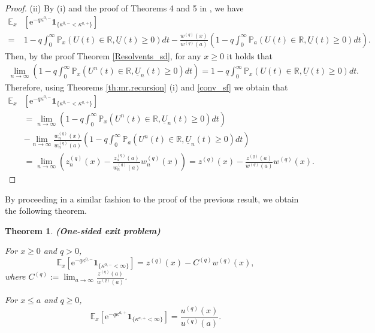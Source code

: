 \documentclass[12pt,reqno]{amsart}
\newtheorem{theorem}{Theorem}
\theoremstyle{definition}
\theoremstyle{remark}
\newcommand{\e}{\mathbb{E}}
\newcommand{\ind}{\mathbf{1}}
\newcommand{\wq}{w^{(q)}}
\begin{document}
\begin{proof}
(ii) By (i) and the proof of Theorems 4 and 5 in \cite{kyprianouloeffen2010}, we have
\begin{align*}
\e_x &\left[ \mathrm{e}^{-q \kappa^{0,-}} \ind_{\{\kappa^{0,-}<\kappa^{a,+}\}} \right]\\
=&1-q\int_0^{\infty}\mathbb{P}_x(U(t)\in\mathbb{R},\underline{U}(t)\geq 0)dt-
 \frac{\wq(x)}{\wq(a)}\left(1-q\int_0^{\infty}\mathbb{P}_a(U(t)\in\mathbb{R},\underline{U}(t)\geq 0)dt\right). 
\end{align*}
Then, by the proof Theorem \ref{Resolvents_sd}, for any $x\geq0$ it holds that
\begin{align*}
\lim_{n\to\infty}\left(1-q\int_0^{\infty}\mathbb{P}_x(U^n(t)\in\mathbb{R},\underline{U}_n(t)\geq 0)dt\right)=1-q\int_0^{\infty}\mathbb{P}_x(U(t)\in\mathbb{R},\underline{U}(t)\geq 0)dt.
\end{align*}
Therefore, using Theorems \ref{th:mr.recursion} (i) and \ref{conv_sf} we obtain that
\begin{align*}
\e_x &\left[ \mathrm{e}^{-q \kappa^{0,-}} \ind_{\{\kappa^{0,-}<\kappa^{a,+}\}} \right]\\
&=\lim_{n\to\infty}\left(1-q\int_0^{\infty}\mathbb{P}_x(U^n(t)\in\mathbb{R},\underline{U}_n(t)\geq 0)dt\right)\\
&-\lim_{n\to\infty}\frac{\wq_n(x)}{\wq_n(a)} \left(1-q\int_0^{\infty}\mathbb{P}_a(U^n(t)\in\mathbb{R},\underline{U}_n(t)\geq 0)dt\right)\\
&=\lim_{n\to\infty}\left(z^{(q)}_n(x)-\frac{z_n^{(q)}(a)}{w_n^{(q)}(a)}w_n^{(q)}(x)\right)
=z^{(q)}(x)-\frac{z^{(q)}(a)}{w^{(q)}(a)}w^{(q)}(x).
\end{align*}
\end{proof}
By proceeding in a similar fashion to the proof of the previous result, we obtain the following theorem.
\begin{theorem}{\textbf{(One-sided exit problem)}}\label{one_sided_sd}\\

	\item[(i)] For $x \geq 0$ and $q>0$, 
		\begin{equation}\label{main_onesided_down_sd}
		\e_x \left[ \mathrm{e}^{-q \kappa^{0,-}} \ind_{\{\kappa^{0,-}<\infty\}} \right] =z^{(q)}(x)-C^{(q)}\wq(x),
		\end{equation} 
		where $C^{(q)}:=\lim_{a \to \infty} \frac{z^{(q)}(a)}{\wq(a)}$.
		\item[(ii)]
		For $x\leq a$ and $q \geq 0$,
		\begin{equation}\label{main_onesided_up_sd}
		\e_x \left[ \mathrm{e}^{-q \kappa^{a,+}} \ind_{\{\kappa^{a,+}<\infty\}} \right] =
		\frac{u^{(q)}(x)}{u^{(q)}(a)}.
		\end{equation}
\end{theorem}
\end{document}
